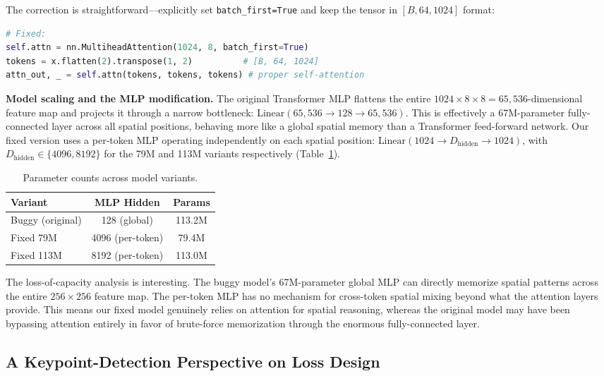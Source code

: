 \documentclass[10pt,twocolumn]{article}
\begin{document}
The correction is straightforward---explicitly set \texttt{batch\_first=True} and keep the tensor in $[B, 64, 1024]$ format:

\begin{lstlisting}[language=Python]
# Fixed:
self.attn = nn.MultiheadAttention(1024, 8, batch_first=True)
tokens = x.flatten(2).transpose(1, 2)          # [B, 64, 1024]
attn_out, _ = self.attn(tokens, tokens, tokens) # proper self-attention
\end{lstlisting}

\textbf{Model scaling and the MLP modification.} The original Transformer MLP flattens the entire $1024\times 8\times 8 = 65{,}536$-dimensional feature map and projects it through a narrow bottleneck: $\text{Linear}(65{,}536 \rightarrow 128 \rightarrow 65{,}536)$. This is effectively a 67M-parameter fully-connected layer across all spatial positions, behaving more like a global spatial memory than a Transformer feed-forward network. Our fixed version uses a per-token MLP operating independently on each spatial position: $\text{Linear}(1024 \rightarrow D_{\text{hidden}} \rightarrow 1024)$, with $D_{\text{hidden}} \in \{4096, 8192\}$ for the 79M and 113M variants respectively (Table~\ref{tab:params}).

\begin{table}[t]
\centering
\caption{Parameter counts across model variants.}
\label{tab:params}
\begin{tabular}{lcc}
\toprule
Variant & MLP Hidden & Params \\
\midrule
Buggy (original) & 128 (global) & 113.2M \\
Fixed 79M & 4096 (per-token) & 79.4M \\
Fixed 113M & 8192 (per-token) & 113.0M \\
\bottomrule
\end{tabular}
\end{table}

The loss-of-capacity analysis is interesting. The buggy model's 67M-parameter global MLP can directly memorize spatial patterns across the entire $256\times 256$ feature map. The per-token MLP has no mechanism for cross-token spatial mixing beyond what the attention layers provide. This means our fixed model genuinely relies on attention for spatial reasoning, whereas the original model may have been bypassing attention entirely in favor of brute-force memorization through the enormous fully-connected layer.


\subsection{A Keypoint-Detection Perspective on Loss Design}
\end{document}
